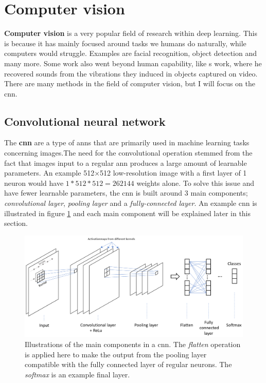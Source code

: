 \section{Computer vision} \label{computer vision}
    \textbf{Computer vision} is a very popular field of research within deep learning\cite{voulodimos2018deep_computer_vision}. This is because it has mainly focused around tasks we humans do naturally, while computers would struggle. Examples are facial recognition, object detection and many more. Some work also went beyond human capability, like \citeauthor{davis2014visual_deep_video_audio}s\cite{davis2014visual_deep_video_audio} work, where he recovered sounds from the vibrations they induced in objects captured on video. There are many methods in the field of computer vision, but I will focus on the \gls{cnn}.
    
    
    
\subsection{Convolutional neural network} \label{cnn}
    The \textbf{\gls{cnn}} are a type of \gls{ann}s that are primarily used in machine learning tasks concerning images\cite{o2015introduction_convolutions}.The need for the convolutional operation stemmed from the fact that images input to a regular \gls{ann} produces a large amount of learnable parameters. An example 512×512 low-resolution image with a first layer of 1 neuron would have $1*512*512 = 262144$ weights alone.  To solve this issue and have fewer learnable parameters, the \gls{cnn} is built around 3 main components\cite{o2015introduction_convolutions}; \textit{convolutional layer}, \textit{pooling layer} and a \textit{fully-connected layer}. An example \gls{cnn} is illustrated in figure \ref{convolutional_neural_network_fig} and each main component will be explained later in this section.

    \begin{figure}[H]
        \centering
        \includegraphics[scale=0.4]{figures/conv_net.png}
        \caption[Convolutional neural network example]{Illustrations of the main components in a \gls{cnn}. The \textit{flatten} operation is applied here to make the output from the pooling layer compatible with the fully connected layer of regular neurons. The \textit{softmax} is an example final layer.}
      	\medskip 
        \label{convolutional_neural_network_fig}
    \end{figure}
    
